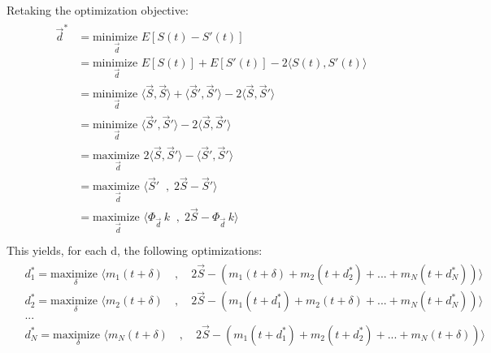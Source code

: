 \documentclass[11pt]{scrartcl} %
\begin{document}

  

  Retaking the optimization objective:
  \begin{align*}
    \begin{aligned}
      \vec{d}^* &= \underset{\vec{d}}{\text{minimize }}
      E[S{\scriptstyle (t)}-S'{\scriptstyle (t)}]\\
      &= \underset{\vec{d}}{\text{minimize }} E[S{\scriptstyle (t)}]+E[S'{\scriptstyle (t)}]-2\langle S{\scriptstyle (t)},S'{\scriptstyle (t)}\rangle\\
      &= \underset{\vec{d}}{\text{minimize }} \langle \vec{S}, \vec{S} \rangle + \langle \vec{S}', \vec{S}' \rangle - 2 \langle \vec{S},  \vec{S}' \rangle\\
      &= \underset{\vec{d}}{\text{minimize }} \langle \vec{S}', \vec{S}' \rangle - 2 \langle \vec{S},  \vec{S}' \rangle\\
      &= \underset{\vec{d}}{\text{maximize }} 2 \langle \vec{S},  \vec{S}' \rangle - \langle \vec{S}', \vec{S}' \rangle\\
      &= \underset{\vec{d}}{\text{maximize }} \langle \vec{S}' \;\;,\; 2\vec{S}-\vec{S}'  \rangle\\
      &= \underset{\vec{d}}{\text{maximize }} \langle \Phi_{\vec{d}\;} k \;\;,\; 2\vec{S}-\Phi_{\vec{d}\;} k  \rangle\\
    \end{aligned}
  \end{align*}
  This yields, for each d, the following optimizations:
  \begin{align*}
  \begin{aligned}
    &d_1^* = \underset{\delta}{\text{maximize }} \Big\langle m_1{\scriptstyle (t+\delta)}\quad ,\quad 2\vec{S}- (m_1{\scriptstyle (t+\delta)}+m_2{\scriptstyle (t+d_2^*)}+...+m_N{\scriptstyle (t+d_N^*)})\Big\rangle\\
    &d_2^* = \underset{\delta}{\text{maximize }} \Big\langle m_2{\scriptstyle (t+\delta)}\quad ,\quad 2\vec{S}- (m_1{\scriptstyle (t+d_1^*)} + m_2{\scriptstyle (t+\delta)}+...+m_N{\scriptstyle (t+d_N^*)})\Big\rangle\\
    &...\\
    &d_N^* = \underset{\delta}{\text{maximize }} \Big\langle m_N{\scriptstyle (t+\delta)}\quad ,\quad 2\vec{S}- (m_1{\scriptstyle (t+d_1^*)} + m_2{\scriptstyle (t+d_2^*)}+...+m_N{\scriptstyle (t+\delta)})\Big\rangle\\
    \end{aligned}
  \end{align*}
\end{document}
